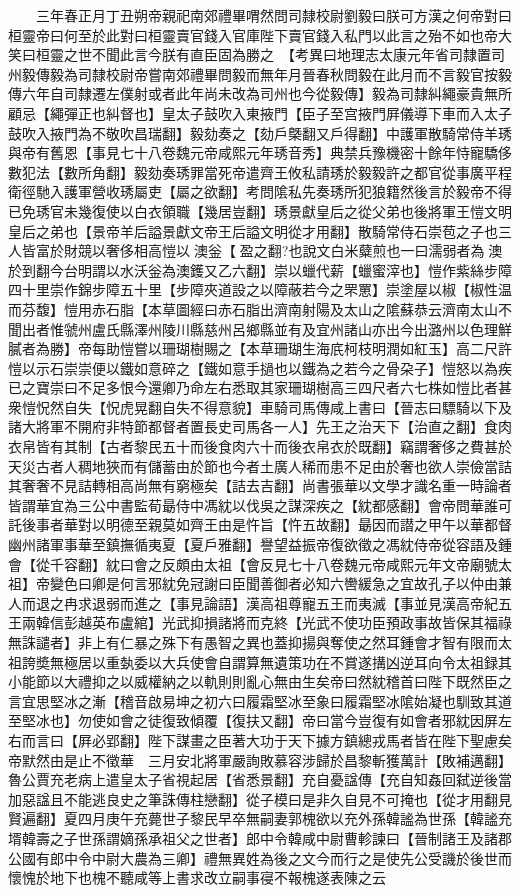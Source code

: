 　　三年春正月丁丑朔帝親祀南郊禮畢喟然問司隸校尉劉毅曰朕可方漢之何帝對曰桓靈帝曰何至於此對曰桓靈賣官錢入官庫陛下賣官錢入私門以此言之殆不如也帝大笑曰桓靈之世不聞此言今朕有直臣固為勝之　【考異曰地理志太康元年省司隸置司州毅傳毅為司隸校尉帝嘗南郊禮畢問毅而無年月晉春秋問毅在此月而不言毅官按毅傳六年自司隸遷左僕射或者此年尚未改為司州也今從毅傳】毅為司隸糾繩豪貴無所顧忌【繩彈正也糾督也】皇太子鼓吹入東掖門【臣子至宫掖門屛儀導下車而入太子鼓吹入掖門為不敬吹昌瑞翻】毅劾奏之【劾戶槩翻又戶得翻】中護軍散騎常侍羊琇與帝有舊恩【事見七十八卷魏元帝咸熙元年琇音秀】典禁兵豫機密十餘年恃寵驕侈數犯法【數所角翻】毅劾奏琇罪當死帝遣齊王攸私請琇於毅毅許之都官從事廣平程衛徑馳入護軍營收琇屬吏【屬之欲翻】考問隂私先奏琇所犯狼籍然後言於毅帝不得已免琇官未幾復使以白衣領職【幾居豈翻】琇景獻皇后之從父弟也後將軍王愷文明皇后之弟也【景帝羊后謚景獻文帝王后謚文明從才用翻】散騎常侍石崇苞之子也三人皆富於財競以奢侈相高愷以澳釡【盈之翻?也說文白米糵煎也一曰濡弱者為澳於到翻今台明謂以水沃釡為澳鑊又乙六翻】崇以蠟代薪【蠟蜜滓也】愷作紫絲步障四十里崇作錦步障五十里【步障夾道設之以障蔽若今之罘罳】崇塗屋以椒【椒性温而芬馥】愷用赤石脂【本草圖經曰赤石脂出濟南射陽及太山之隂蘇恭云濟南太山不聞出者惟虢州盧氏縣澤州陵川縣慈州呂鄉縣並有及宜州諸山亦出今出潞州以色理鮮膩者為勝】帝每助愷嘗以珊瑚樹賜之【本草珊瑚生海㡳柯枝明潤如紅玉】高二尺許愷以示石崇崇便以鐵如意碎之【鐵如意手撾也以鐵為之若今之骨朶子】愷怒以為疾已之寶崇曰不足多恨今還卿乃命左右悉取其家珊瑚樹高三四尺者六七株如愷比者甚衆愷怳然自失【怳虎晃翻自失不得意貌】車騎司馬傳咸上書曰【晉志曰驃騎以下及諸大將軍不開府非特節都督者置長史司馬各一人】先王之治天下【治直之翻】食肉衣帛皆有其制【古者黎民五十而後食肉六十而後衣帛衣於既翻】竊謂奢侈之費甚於天災古者人稠地狹而有儲蓄由於節也今者土廣人稀而患不足由於奢也欲人崇儉當詰其奢奢不見詰轉相高尚無有窮極矣【詰去吉翻】尚書張華以文學才識名重一時論者皆謂華宜為三公中書監荀朂侍中馮紞以伐吳之謀深疾之【紞都感翻】會帝問華誰可託後事者華對以明德至親莫如齊王由是忤旨【忤五故翻】朂因而譛之甲午以華都督幽州諸軍事華至鎮撫循夷夏【夏戶雅翻】譽望益振帝復欲徵之馮紞侍帝從容語及鍾會【從千容翻】紞曰會之反頗由太祖【會反見七十八卷魏元帝咸熙元年文帝廟號太祖】帝變色曰卿是何言邪紞免冠謝曰臣聞善御者必知六轡緩急之宜故孔子以仲由兼人而退之冉求退弱而進之【事見論語】漢高祖尊寵五王而夷滅【事並見漢高帝紀五王兩韓信彭越英布盧綰】光武抑損諸將而克終【光武不使功臣預政事故皆保其福祿無誅譴者】非上有仁暴之殊下有愚智之異也蓋抑揚與奪使之然耳鍾會才智有限而太祖誇奬無極居以重埶委以大兵使會自謂算無遺策功在不賞遂搆凶逆耳向令太祖録其小能節以大禮抑之以威權納之以軌則則亂心無由生矣帝曰然紞稽首曰陛下既然臣之言宜思堅冰之漸【稽音啟易坤之初六曰履霜堅冰至象曰履霜堅冰隂始凝也馴致其道至堅冰也】勿使如會之徒復致傾覆【復扶又翻】帝曰當今豈復有如會者邪紞因屏左右而言曰【屛必郢翻】陛下謀畫之臣著大功于天下據方鎮總戎馬者皆在陛下聖慮矣帝默然由是止不徵華　三月安北將軍嚴詢敗慕容涉歸於昌黎斬獲萬計【敗補邁翻】　魯公賈充老病上遣皇太子省視起居【省悉景翻】充自憂諡傳【充自知姦回弑逆後當加惡諡且不能逃良史之筆誅傳柱戀翻】從子模曰是非久自見不可掩也【從才用翻見賢遍翻】夏四月庚午充薨世子黎民早卒無嗣妻郭槐欲以充外孫韓謐為世孫【韓謐充壻韓壽之子世孫謂嫡孫承祖父之世者】郎中令韓咸中尉曹軫諫曰【晉制諸王及諸郡公國有郎中令中尉大農為三卿】禮無異姓為後之文今而行之是使先公受譏於後世而懷愧於地下也槐不聽咸等上書求改立嗣事寑不報槐遂表陳之云